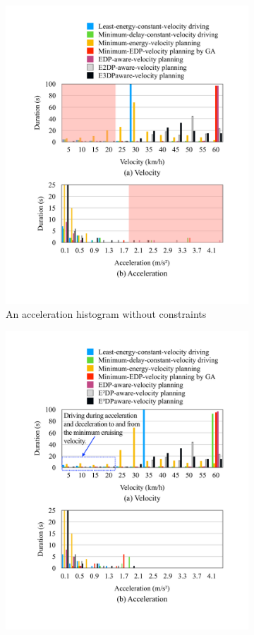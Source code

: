 \documentclass{IEEEtran}
\begin{document}
\begin{figure}
\begin{subfigure}{0.5\textwidth}
	\includegraphics[width=\hsize]{Figures/Histogram_noconst_acc.pdf}
	\caption{An acceleration histogram without constraints}
	\label{fig:histogram_noconst_acc}
	\end{subfigure}
	\begin{subfigure}{0.5\textwidth}
	\includegraphics[width=\hsize]{Figures/Histogram_vel.pdf}

\end{subfigure}
\end{figure}
\end{document}
